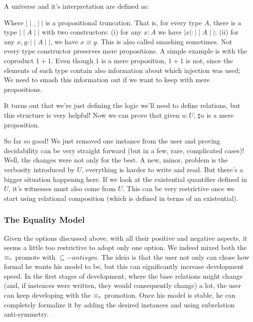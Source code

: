   A universe and it's interpretation are defined as:
  
  
  Where $\mid\mid\_\mid\mid$ is a propositional truncation. That is, for every type $A$,
  there is a type $\mid\mid A \mid\mid$ with two constructors: (i) for any $x : A$ we have
  $\mid x \mid : \mid\mid A \mid\mid$; (ii) for any $x , y : \mid\mid A \mid\mid$, we have
  $x \equiv y$. This is also called smashing sometimes. Not every type constructor 
  preserves mere propositions. A simple example is with the coproduct
  $1 + 1$. Even though $1$ is a mere proposition, $1 + 1$ is not, since the elements of such type
  contain also information about which injection was used; We need to smash this information out
  if we want to keep with mere propositions.
  
  It turns out that we're just defining the logic we'll need to define relations, but this
  structure is very helpful! Now we can prove that given $u : U$, $\sharp u$ is a mere proposition.
  
  
  So far so good! We just removed one instance from the user and proving decidability can be very
  straight forward (but in a few, rare, complicated cases)! Well, the changes were not only for the best.
  A new, minor, problem is the verbosity introduced by $U$, everything is harder to write and read.
  But there's a bigger situation happening here. If we look at the existential quantifier defined in $U$,
  it's witnesses must also come from $U$. This can be very restrictive once we start using relational
  composition (which is defined in terms of an existential).

\subsubsection{The Equality Model}
  
  Given the options discussed above, with all their positive and negative aspects, it seems
  a little too restrictive to adopt only one option. We indeed mixed both the $\equiv_r$ promote
  with $\subseteq-antisym$. The ideia is that the user not only can chose how formal he wants his model
  to be, but this can significantly increase development speed. In the first stages of development, where
  the base relations might change (and, if instences were written, they would consequently change) a lot,
  the user can keep developing with the $\equiv_r$ promotion. Once his model is stable, he can completely
  formalize it by adding the desired instances and using subrelation anti-symmetry.

